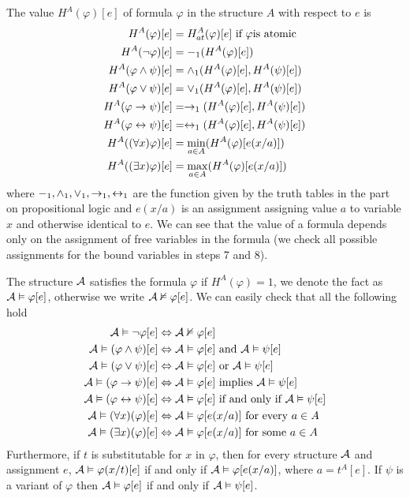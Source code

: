 The value $H^A(\varphi)[e]$ of formula $\varphi$ in the structure $A$ with respect to $e$ is 
\begin{align*}
	H^A(\varphi)[e] & = H^A_{at}(\varphi)[e] \text{ if } \varphi \text{is atomic} \\
	H^A(\neg \varphi)[e] & = -_1(H^A(\varphi)[e])\\
	H^A(\varphi \land \psi)[e] & = \land_1(H^A(\varphi)[e], H^A(\psi)[e])\\
	H^A(\varphi \lor \psi)[e] & = \lor_1(H^A(\varphi)[e], H^A(\psi)[e])\\
	H^A(\varphi \to \psi)[e] & = \to_1(H^A(\varphi)[e], H^A(\psi)[e])\\
	H^A(\varphi \leftrightarrow \psi)[e] & = \leftrightarrow_1(H^A(\varphi)[e], H^A(\psi)[e])\\
	H^A((\forall x)\varphi)[e] & = \min_{a \in A}(H^A(\varphi)[e(x/a)])\\
	H^A((\exists x)\varphi)[e] & = \max_{a \in A}(H^A(\varphi)[e(x/a)])
\end{align*}
where $-_1, \land_1, \lor_1, \to_1, \leftrightarrow_1$ are the function given by the truth tables in the part on propositional logic and $e(x/a)$ is an assignment  assigning value $a$ to variable $x$ and otherwise identical to $e$. We can see that the value of a formula depends only on the assignment of free variables in the formula (we check all possible assignments for the bound variables in steps 7 and 8).

The structure $\mathcal{A}$ satisfies the formula $\varphi$ if $H^A(\varphi) = 1$, we denote the fact as $\mathcal{A} \vDash \varphi[e]$, otherwise we write $\mathcal{A} \nvDash \varphi[e]$. We can easily check that all the following hold
\begin{align*}
\mathcal{A} \vDash \neg \varphi[e] & \Leftrightarrow \mathcal{A} \nvDash \varphi[e] \\
\mathcal{A} \vDash (\varphi \land \psi)[e] & \Leftrightarrow \mathcal{A} \vDash \varphi[e] \text{ and } \mathcal{A} \vDash \psi[e]\\
\mathcal{A} \vDash (\varphi \lor \psi)[e] & \Leftrightarrow \mathcal{A} \vDash \varphi[e] \text{ or } \mathcal{A} \vDash \psi[e]\\ 
\mathcal{A} \vDash (\varphi \to \psi)[e] & \Leftrightarrow \mathcal{A} \vDash \varphi[e] \text{ implies } \mathcal{A} \vDash \psi[e]\\
\mathcal{A} \vDash (\varphi \leftrightarrow \psi)[e] & \Leftrightarrow \mathcal{A} \vDash \varphi[e] \text{ if and only if } \mathcal{A} \vDash \psi[e]\\
\mathcal{A} \vDash (\forall x)(\varphi)[e] & \Leftrightarrow \mathcal{A} \vDash \varphi[e(x/a)] \text{ for every } a \in A \\
\mathcal{A} \vDash (\exists x)(\varphi)[e] & \Leftrightarrow \mathcal{A} \vDash \varphi[e(x/a)] \text{ for some } a \in A
\end{align*}
Furthermore, if $t$ is substitutable for $x$ in $\varphi$, then for every structure $\mathcal{A}$ and assignment $e$, $\mathcal{A} \vDash \varphi(x/t)[e]$ if and only if $\mathcal{A} \vDash \varphi[e(x/a)]$, where $a = t^A[e]$. If $\psi$ is a variant of $\varphi$ then $\mathcal{A} \vDash \varphi[e]$ if and only if $\mathcal{A} \vDash \psi[e]$.

